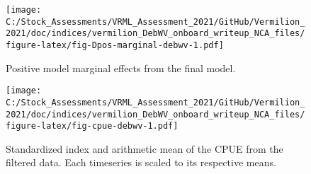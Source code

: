 \documentclass[
]{article}
\begin{document}
\begin{figure}
\centering
\texttt{[image: C:/Stock\_Assessments/VRML\_Assessment\_2021/GitHub/Vermilion\_2021/doc/indices/vermilion\_DebWV\_onboard\_writeup\_NCA\_files/figure-latex/fig-Dpos-marginal-debwv-1.pdf]}
\caption{\label{fig:fig-Dpos-marginal-debwv}Positive model marginal effects from the final model.}
\end{figure}

\begin{figure}
\centering
\texttt{[image: C:/Stock\_Assessments/VRML\_Assessment\_2021/GitHub/Vermilion\_2021/doc/indices/vermilion\_DebWV\_onboard\_writeup\_NCA\_files/figure-latex/fig-cpue-debwv-1.pdf]}
\caption{\label{fig:fig-cpue-debwv}Standardized index and arithmetic mean of the CPUE from the filtered data. Each timeseries is scaled to its respective means.}
\end{figure}
\end{document}
